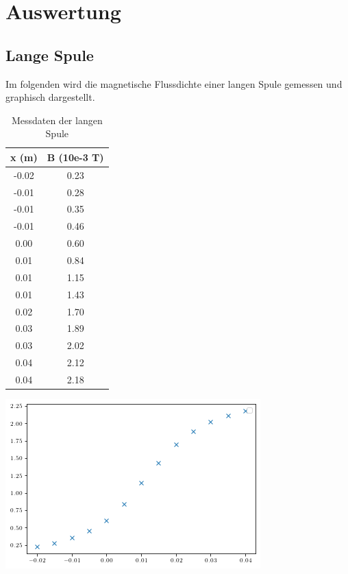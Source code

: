\section{Auswertung}
\label{sec:Auswertung}

\subsection{Lange Spule}

Im folgenden wird die magnetische Flussdichte einer langen Spule gemessen und graphisch dargestellt.
\begin{table}
\centering
\caption{Messdaten der langen Spule}
\begin{tabular}{c c}
  \toprule
  x (m) &  B (10e-3 T) \\
  \midrule
  -0.02 &         0.23 \\
  -0.01 &         0.28 \\
  -0.01 &         0.35 \\
  -0.01 &         0.46 \\
    0.00 &         0.60 \\
    0.01 &         0.84 \\
    0.01 &         1.15 \\
    0.01 &         1.43 \\
    0.02 &         1.70 \\
    0.03 &         1.89 \\
    0.03 &         2.02 \\
    0.04 &         2.12 \\
    0.04 &         2.18 \\
  \bottomrule
\end{tabular}
\end{table}

\includegraphics[width=\textwidth]{pictures/LangeSpule1.png}    %


